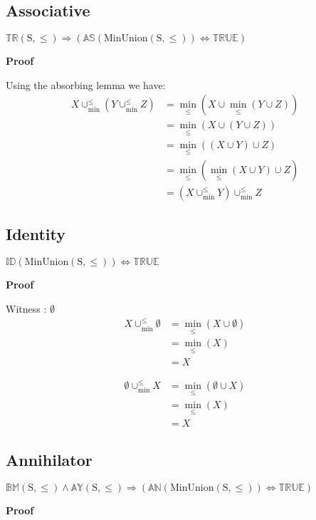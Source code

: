 \documentclass[10pt]{article}
\newcommand{\propname}[1]{{\mathbb{#1}}}
\newcommand{\minunion}{\cup_{\min}^{\leq}}
\newcommand{\proof}{\vspace{1em} \textbf{Proof} \vspace{1em}}
\begin{document}
\subsection{Associative}

$\propname{TR}(\mathrm{S, \leq}) \Rightarrow (\propname{AS}(\mathrm{MinUnion(S,\leq)}) \Leftrightarrow \propname{TRUE})$

\proof

Using the absorbing lemma we have:
\begin{align*}
X \minunion (Y \minunion Z) & = \min_\leq(X \cup \min_\leq(Y \cup Z)) \\
							& = \min_\leq(X \cup (Y \cup Z)) \\
							& = \min_\leq((X \cup Y) \cup Z) \\
							& = \min_\leq(\min_\leq(X \cup Y) \cup Z) \\
							& = (X \minunion Y) \minunion Z
\end{align*}



\subsection{Identity}

$\propname{ID}(\mathrm{MinUnion(S,\leq)}) \Leftrightarrow \propname{TRUE}$

\proof

Witness : $\emptyset$
\begin{align*}
X \minunion \emptyset 	& = \min_\leq(X \cup \emptyset) \\
						& = \min_\leq(X) \\
						& = X
\end{align*}

\begin{align*}
\emptyset \minunion X 	& = \min_\leq(\emptyset \cup X) \\
						& = \min_\leq(X) \\
						& = X
\end{align*}



\subsection{Annihilator}

$\propname{BM}(\mathrm{S,\leq}) \wedge \propname{AY}(\mathrm{S,\leq}) \Rightarrow (\propname{AN}(\mathrm{MinUnion(S,\leq)}) \Leftrightarrow \propname{TRUE})$

\proof
\end{document}
